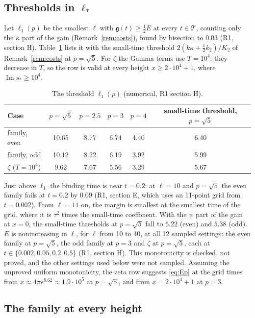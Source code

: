 \documentclass[11pt]{article}
\theoremstyle{definition}
\theoremstyle{remark}
\newcommand{\im}{\operatorname{Im}}
\numberwithin{equation}{section}
\begin{document}
\subsection{Thresholds in \texorpdfstring{$\ell_*$}{l*}}

Let $\ell_1(p)$ be the smallest $\ell$ with $\mathfrak g(t)\ge\frac12E$ at
every $t\in\mathcal T$, counting only the $\kappa$ part of the gain
(Remark~\ref{rem:costs}), found by bisection to $0.03$ (R1, section H).
Table~\ref{tab:thresholds} lists it with the small-time threshold
$2(k\kappa+\frac12k_2)/K_2$ of Remark~\ref{rem:costs} at $p=\sqrt5$. For
$\zeta$ the Gamma terms use $T=10^4$; they decrease in $T$, so the row is
valid at every height $x\ge2\cdot10^4+1$, where $\im s_*\ge10^4$.

\begin{table}[ht]
\centering\small
\begin{tabular}{@{}lccccc@{}}
\toprule
Case & $p=\sqrt5$ & $p=2.5$ & $p=3$ & $p=4$ & small-time threshold, $p=\sqrt5$\\
\midrule
family, even & 10.65 & 8.77 & 6.74 & 4.40 & 6.40\\
family, odd & 10.12 & 8.22 & 6.19 & 3.92 & 5.99\\
$\zeta$ ($T=10^4$) & 9.62 & 7.67 & 5.56 & 3.29 & 5.67\\
\bottomrule
\end{tabular}
\caption{The threshold $\ell_1(p)$ (numerical, R1 section H).}\label{tab:thresholds}
\end{table}

Just above $\ell_1$ the binding time is near $t=0.2$: at $\ell=10$ and
$p=\sqrt5$ the even family fails at $t=0.2$ by $0.09$ (R1, section E,
which uses an 11-point grid from $t=0.002$).
From $\ell=11$ on, the margin is smallest at the smallest time of the grid,
where it is $\tau^2$ times the small-time coefficient. With the $\psi$
part of the gain at $x=0$, the small-time thresholds at $p=\sqrt5$ fall to
$5.22$ (even) and $5.38$ (odd). $E$ is nonincreasing in $\ell$, for $\ell$
from 10 to 40, at all 12 sampled settings: the even family at $p=\sqrt5$,
the odd family at $p=3$ and $\zeta$ at $p=\sqrt5$, each at
$t\in\{0.002,0.05,0.2,0.5\}$ (R1, section H). This monotonicity is
checked, not proved, and the other settings used below were not
sampled. Assuming the unproved uniform monotonicity, the zeta row suggests
\eqref{eq:Ep} at the grid times from $x\approx4\pi e^{9.62}\approx1.9\cdot10^5$ at
$p=\sqrt5$, and from $x=2\cdot10^4+1$ at $p=3$.

\subsection{The family at every height}\label{sec:family}
\end{document}
